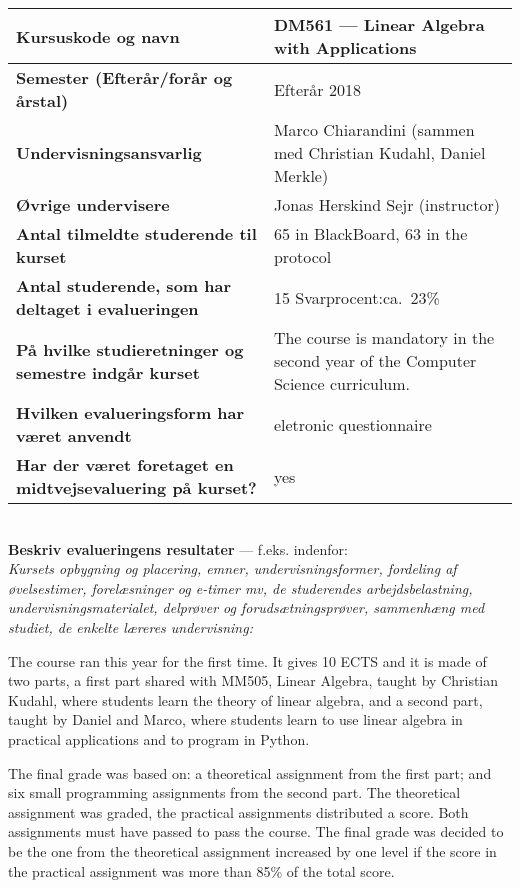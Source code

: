 \documentclass[11pt]{article}
\begin{document}
\tabulinesep=1.2mm
\begin{tabu} to 1.0 \hline
Kursuskode og navn &  DM561 --- Linear Algebra with Applications \\\hline
Semester {\normalfont (Efterår/forår og årstal)} & Efterår 2018 \\\hline
Undervisnings\-ansvarlig &  Marco Chiarandini (sammen med Christian Kudahl, Daniel Merkle)  \\\hline
Øvrige undervisere &   Jonas Herskind Sejr (instructor) \\\hline
Antal tilmeldte studerende til kurset & 65 in BlackBoard, 63 in the protocol \\\hline
Antal studerende, som har deltaget i evalueringen &  15  \hfill
Svarprocent:ca.~23\% \\\hline
På hvilke studieretninger og semestre indgår kurset &  The course is mandatory in the second year of the Computer Science curriculum. \\\hline
Hvilken evalueringsform har været anvendt &  eletronic questionnaire \\\hline
Har der været foretaget en midtvejsevaluering på kurset? &  yes  \\ 
\hline
\end{tabu}

~\\[1cm]\textcolor{sdublue}{{\bf Beskriv evalueringens resultater} ---
  f.eks. indenfor:\\ {\small \em Kursets opbygning og placering,
    emner, undervisningsformer, fordeling af øvelsestimer,
    forelæsninger og e-timer mv, de studerendes arbejdsbelastning,
    undervisningsmaterialet, delprøver og forudsætningsprøver,
    sammenhæng med studiet, de enkelte læreres undervisning:}}




The course ran this year for the first time. It gives 10 ECTS and it
is made of two parts, a first part shared with MM505, Linear Algebra,
taught by Christian Kudahl, where students learn the theory of linear
algebra, and a second part, taught by Daniel and Marco, where students
learn to use linear algebra in practical applications and to program
in Python.

The final grade was based on: a theoretical assignment from the first
part; and six small programming assignments from the second part. The
theoretical assignment was graded, the practical assignments
distributed a score. Both assignments must have passed to pass the
course. The final grade was decided to be the one from the theoretical
assignment increased by one level if the score in the practical
assignment was more than 85\% of the total score.
\end{document}
